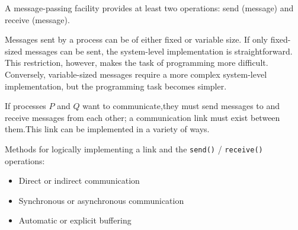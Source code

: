    \par A message-passing facility provides at least two operations: send (message) and receive (message).
    \par Messages sent by a process can be of either fixed or variable size. If only fixed-sized messages can be sent, the system-level implementation is straightforward. This restriction, however, makes the task of programming more difficult. Conversely, variable-sized messages require a more complex system-level implementation, but the programming task becomes simpler.
    \par If processes $P$ and $Q$ want to communicate,they must send messages to and receive messages from each other; a communication link must exist between them.This link can be implemented in a variety of ways.
    \par Methods for logically implementing a link and the \lstinline{send()} / \lstinline{receive()} operations:
    \begin{itemize}
      \item Direct or indirect communication
      \item Synchronous or asynchronous communication
      \item Automatic or explicit buffering
    \end{itemize}